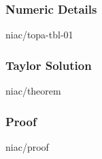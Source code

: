 \documentclass[]{beamer}
\begin{document}
\begin{frame}\frametitle{Numeric Details}
\center
	\begin{overpic}[ scale = 0.45 ]
		{\pLocalGraphics niac/topa-tbl-01}
	\end{overpic}
\end{frame}


\begin{frame}\frametitle{Taylor Solution}
\center
	\begin{overpic}[ scale = 0.5 ]
		{\pLocalGraphics niac/theorem}
	\end{overpic}
\end{frame}

\begin{frame}\frametitle{Proof\jumpBig}
\center
	\begin{overpic}[ scale = 0.5 ]
		{\pLocalGraphics niac/proof}
	\end{overpic}
\end{frame}

\end{document}
